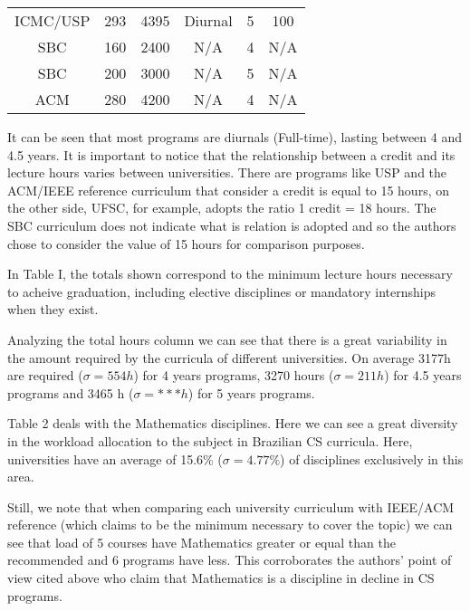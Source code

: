 \documentclass[conference]{IEEEtran}
\begin{document}
\begin{table*}
\begin{tabular}{|c|c|c|c|c|c|}
        ICMC/USP \cite{icmc}& 293           & 4395        & Diurnal          & 5               & 100                  \\ 
        SBC \cite{sbc}     & 160            & 2400        & N/A              & 4               & N/A                  \\ 
        SBC \cite{sbc}     & 200            & 3000        & N/A              & 5               & N/A                  \\ 
        ACM \cite{cs2008}  & 280            & 4200        & N/A              & 4               & N/A                  \\
        \hline
    \end{tabular}
\end{table*}

	It can be seen that most programs are diurnals (Full-time), lasting between 4 and 4.5 years. It is important to notice that the relationship between a credit and its lecture hours varies between universities. There are programs like USP and the ACM/IEEE reference curriculum that consider a credit is equal to 15 hours, on the other side, UFSC, for example, adopts the ratio 1 credit = 18 hours. The SBC curriculum does not indicate what is relation is adopted and so the authors chose to consider the value of 15 hours for comparison purposes.

	In Table I, the totals shown correspond to the minimum lecture hours necessary to acheive graduation, including elective disciplines or mandatory internships when they exist.
	
	Analyzing the total hours column we can see that there is a great variability in the amount required by the curricula of different universities. On average 3177h are required ($ \sigma = 554h $) for 4 years programs, 3270 hours ($ \sigma = 211h $) for 4.5 years programs and 3465 h ($ \sigma = ***h $) for 5 years programs.

	Table 2 deals with the Mathematics disciplines. Here we can see a great diversity in the workload allocation to the subject in Brazilian CS curricula. Here, universities have an average of 15.6\% ($ \sigma = 4.77\% $) of disciplines exclusively in this area.

	Still, we note that when comparing each university curriculum with IEEE/ACM reference (which claims to be the minimum necessary to cover the topic) we can see that load of 5 courses have Mathematics greater or equal than the recommended and 6 programs have less. This corroborates the authors' point of view cited above who claim that Mathematics is a discipline in decline in CS programs.
\end{document}
